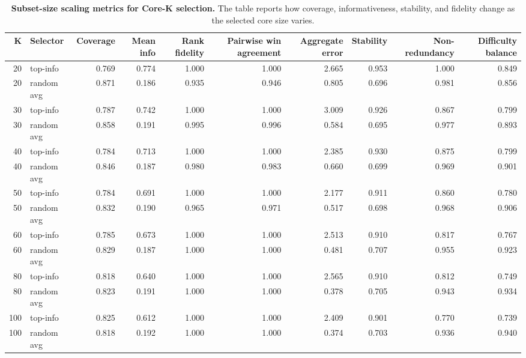 \begin{table}
\caption{\textbf{Subset-size scaling metrics for Core-K selection.} The table reports how coverage, informativeness, stability, and fidelity change as the selected core size varies.}
\label{tab:table09_k_scaling_metrics}
\begin{tabular}{rlrrrrrrrr}
\toprule
\textbf{K} & \textbf{Selector} & \textbf{Coverage} & \textbf{Mean info} & \textbf{Rank fidelity} & \textbf{Pairwise win agreement} & \textbf{Aggregate error} & \textbf{Stability} & \textbf{Non-redundancy} & \textbf{Difficulty balance} \\
\midrule
20 & top-info & 0.769 & 0.774 & 1.000 & 1.000 & 2.665 & 0.953 & 1.000 & 0.849 \\
20 & random avg & 0.871 & 0.186 & 0.935 & 0.946 & 0.805 & 0.696 & 0.981 & 0.856 \\
30 & top-info & 0.787 & 0.742 & 1.000 & 1.000 & 3.009 & 0.926 & 0.867 & 0.799 \\
30 & random avg & 0.858 & 0.191 & 0.995 & 0.996 & 0.584 & 0.695 & 0.977 & 0.893 \\
40 & top-info & 0.784 & 0.713 & 1.000 & 1.000 & 2.385 & 0.930 & 0.875 & 0.799 \\
40 & random avg & 0.846 & 0.187 & 0.980 & 0.983 & 0.660 & 0.699 & 0.969 & 0.901 \\
50 & top-info & 0.784 & 0.691 & 1.000 & 1.000 & 2.177 & 0.911 & 0.860 & 0.780 \\
50 & random avg & 0.832 & 0.190 & 0.965 & 0.971 & 0.517 & 0.698 & 0.968 & 0.906 \\
60 & top-info & 0.785 & 0.673 & 1.000 & 1.000 & 2.513 & 0.910 & 0.817 & 0.767 \\
60 & random avg & 0.829 & 0.187 & 1.000 & 1.000 & 0.481 & 0.707 & 0.955 & 0.923 \\
80 & top-info & 0.818 & 0.640 & 1.000 & 1.000 & 2.565 & 0.910 & 0.812 & 0.749 \\
80 & random avg & 0.823 & 0.191 & 1.000 & 1.000 & 0.378 & 0.705 & 0.943 & 0.934 \\
100 & top-info & 0.825 & 0.612 & 1.000 & 1.000 & 2.409 & 0.901 & 0.770 & 0.739 \\
100 & random avg & 0.818 & 0.192 & 1.000 & 1.000 & 0.374 & 0.703 & 0.936 & 0.940 \\
\bottomrule
\end{tabular}
\end{table}
